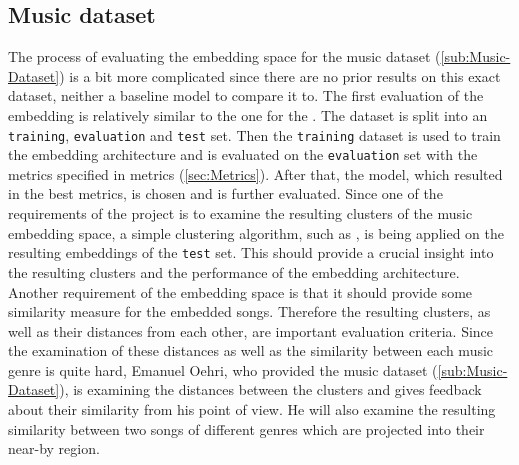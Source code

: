\subsection{Music dataset}
\label{sub:Eval-Music}
The process of evaluating the embedding space for the music dataset (\ref{sub:Music-Dataset}) is a bit more complicated since there are no prior results on this exact dataset, neither a baseline model to compare it to. The first evaluation of the embedding is relatively similar to the one for the . The dataset is split into an \texttt{training}, \texttt{evaluation} and \texttt{test} set. Then the \texttt{training} dataset is used to train the embedding architecture and is evaluated on the \texttt{evaluation} set with the metrics specified in metrics (\ref{sec:Metrics}). After that, the model, which resulted in the best metrics, is chosen and is further evaluated.
\newline
\newline
Since one of the requirements of the project is to examine the resulting clusters of the music embedding space, a simple clustering algorithm, such as , is being applied on the resulting embeddings of the \texttt{test} set. This should provide a crucial insight into the resulting clusters and the performance of the embedding architecture.
\newline
\newline
Another requirement of the embedding space is that it should provide some similarity measure for the embedded songs. Therefore the resulting clusters, as well as their distances from each other, are important evaluation criteria. Since the examination of these distances as well as the similarity between each music genre is quite hard, Emanuel Oehri, who provided the music dataset (\ref{sub:Music-Dataset}), is examining the distances between the clusters and gives feedback about their similarity from his point of view. He will also examine the resulting similarity between two songs of different genres which are projected into their near-by region.

